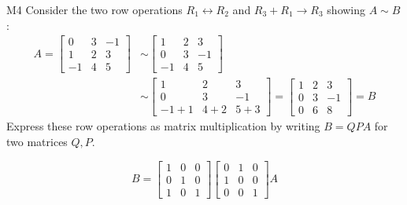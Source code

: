 \begin{problem}{M4}
Consider the two row operations 
\(R_1\leftrightarrow R_2\) and \(R_3+R_1\to R_3\)
showing \(A\sim B\):
\begin{align*}
A
  =
\begin{bmatrix}
0&3&-1\\
1&2&3\\
-1&4&5
\end{bmatrix}
  &\sim
\begin{bmatrix}
1&2&3\\
0&3&-1\\
-1&4&5
\end{bmatrix}
  \\&\sim
\begin{bmatrix}
1&2&3\\
0&3&-1\\
-1+1&4+2&5+3
\end{bmatrix}
  =
\begin{bmatrix}
1&2&3\\
0&3&-1\\
0&6&8
\end{bmatrix}
  = 
B
\end{align*}
Express these row operations as matrix multiplication
by writing \(B=QPA\) for two matrices \(Q,P\).
\end{problem}
\begin{solution}
\[
B
  =
\begin{bmatrix}
  1&0&0\\
  0&1&0\\
  1&0&1
\end{bmatrix}
\begin{bmatrix}
  0&1&0\\
  1&0&0\\
  0&0&1
\end{bmatrix}
A
\]
\end{solution}


